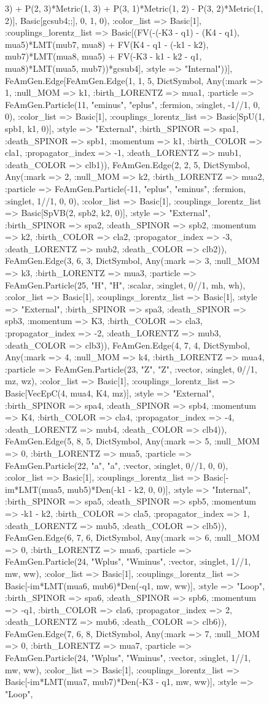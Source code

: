 \documentclass{revtex4}
\begin{document}
\begin{figure}[!htb]
\begin{center}
{3) + P(2, 3)*Metric(1, 3) + P(3, 1)*Metric(1, 2) - P(3, 2)*Metric(1, 2)], Basic[gcsub4;;], 0, 1, 0), :color_list => Basic[1], :couplings_lorentz_list => Basic[(FV(-(-K3 - q1) - (K4 - q1), mua5)*LMT(mub7, mua8) + FV(K4 - q1 - (-k1 - k2), mub7)*LMT(mua8, mua5) + FV(-K3 - k1 - k2 - q1, mua8)*LMT(mua5, mub7))*gcsub4], :style => "Internal"))], FeAmGen.Edge[FeAmGen.Edge(1, 1, 5, Dict{Symbol, Any}(:mark => 1, :null_MOM => k1, :birth_LORENTZ => mua1, :particle => FeAmGen.Particle(11, "eminus", "eplus", :fermion, :singlet, -1//1, 0, 0), :color_list => Basic[1], :couplings_lorentz_list => Basic[SpU(1, spb1, k1, 0)], :style => "External", :birth_SPINOR => spa1, :death_SPINOR => spb1, :momentum => k1, :birth_COLOR => cla1, :propagator_index => -1, :death_LORENTZ => mub1, :death_COLOR => clb1)), FeAmGen.Edge(2, 2, 5, Dict{Symbol, Any}(:mark => 2, :null_MOM => k2, :birth_LORENTZ => mua2, :particle => FeAmGen.Particle(-11, "eplus", "eminus", :fermion, :singlet, 1//1, 0, 0), :color_list => Basic[1], :couplings_lorentz_list => Basic[SpVB(2, spb2, k2, 0)], :style => "External", :birth_SPINOR => spa2, :death_SPINOR => spb2, :momentum => k2, :birth_COLOR => cla2, :propagator_index => -3, :death_LORENTZ => mub2, :death_COLOR => clb2)), FeAmGen.Edge(3, 6, 3, Dict{Symbol, Any}(:mark => 3, :null_MOM => k3, :birth_LORENTZ => mua3, :particle => FeAmGen.Particle(25, "H", "H", :scalar, :singlet, 0//1, mh, wh), :color_list => Basic[1], :couplings_lorentz_list => Basic[1], :style => "External", :birth_SPINOR => spa3, :death_SPINOR => spb3, :momentum => K3, :birth_COLOR => cla3, :propagator_index => -2, :death_LORENTZ => mub3, :death_COLOR => clb3)), FeAmGen.Edge(4, 7, 4, Dict{Symbol, Any}(:mark => 4, :null_MOM => k4, :birth_LORENTZ => mua4, :particle => FeAmGen.Particle(23, "Z", "Z", :vector, :singlet, 0//1, mz, wz), :color_list => Basic[1], :couplings_lorentz_list => Basic[VecEpC(4, mua4, K4, mz)], :style => "External", :birth_SPINOR => spa4, :death_SPINOR => spb4, :momentum => K4, :birth_COLOR => cla4, :propagator_index => -4, :death_LORENTZ => mub4, :death_COLOR => clb4)), FeAmGen.Edge(5, 8, 5, Dict{Symbol, Any}(:mark => 5, :null_MOM => 0, :birth_LORENTZ => mua5, :particle => FeAmGen.Particle(22, "a", "a", :vector, :singlet, 0//1, 0, 0), :color_list => Basic[1], :couplings_lorentz_list => Basic[-im*LMT(mua5, mub5)*Den(-k1 - k2, 0, 0)], :style => "Internal", :birth_SPINOR => spa5, :death_SPINOR => spb5, :momentum => -k1 - k2, :birth_COLOR => cla5, :propagator_index => 1, :death_LORENTZ => mub5, :death_COLOR => clb5)), FeAmGen.Edge(6, 7, 6, Dict{Symbol, Any}(:mark => 6, :null_MOM => 0, :birth_LORENTZ => mua6, :particle => FeAmGen.Particle(24, "Wplus", "Wminus", :vector, :singlet, 1//1, mw, ww), :color_list => Basic[1], :couplings_lorentz_list => Basic[-im*LMT(mua6, mub6)*Den(-q1, mw, ww)], :style => "Loop", :birth_SPINOR => spa6, :death_SPINOR => spb6, :momentum => -q1, :birth_COLOR => cla6, :propagator_index => 2, :death_LORENTZ => mub6, :death_COLOR => clb6)), FeAmGen.Edge(7, 6, 8, Dict{Symbol, Any}(:mark => 7, :null_MOM => 0, :birth_LORENTZ => mua7, :particle => FeAmGen.Particle(24, "Wplus", "Wminus", :vector, :singlet, 1//1, mw, ww), :color_list => Basic[1], :couplings_lorentz_list => Basic[-im*LMT(mua7, mub7)*Den(-K3 - q1, mw, ww)], :style => "Loop", }
\end{center}
\end{figure}
\end{document}
